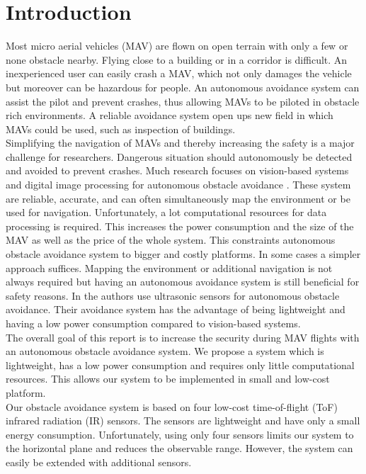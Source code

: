 \chapter{Introduction}
\label{sec:introduction}
Most micro aerial vehicles (MAV) are flown on open terrain with only a few or none obstacle nearby. Flying close to a building or in a corridor is difficult. An inexperienced user can easily crash a MAV, which not only damages the vehicle but moreover can be hazardous for people.  An autonomous avoidance system can assist the pilot and prevent crashes, thus allowing MAVs to be piloted in obstacle rich environments. A reliable avoidance system open ups new field in which MAVs could be used, such as inspection of buildings.\\
Simplifying the navigation of MAVs and thereby increasing the safety is a major challenge for researchers. Dangerous situation should autonomously be detected and avoided to prevent crashes. Much research focuses on vision-based systems and digital image processing for autonomous obstacle avoidance \cite{heng2011autonomous} \cite{frew2004vision} \cite{ahrens2009vision}. These system are reliable, accurate, and can often simultaneously map the environment or be used for navigation. Unfortunately, a lot computational resources for data processing is required. This increases the power consumption and the size of the MAV as well as the price of the whole system. This constraints autonomous obstacle avoidance system to bigger and costly platforms. In some cases a simpler approach suffices. Mapping the environment or additional navigation is not always required but having an autonomous avoidance system is still beneficial for safety reasons. In \cite{gupta2015obstacle} the authors use ultrasonic sensors for autonomous obstacle avoidance. Their avoidance system has the advantage of being lightweight and having a low power consumption compared to vision-based systems.\\
The overall goal of this report is to increase the security during MAV flights with an autonomous obstacle avoidance system. We propose a system which is lightweight, has a low power consumption and requires only little computational resources. This allows our system to be implemented in small and low-cost platform.\\ 
Our obstacle avoidance system is based on four low-cost time-of-flight (ToF) infrared radiation (IR) sensors. The sensors are lightweight and have only a small energy consumption. Unfortunately, using only four sensors limits our system to the horizontal plane and reduces the observable range. However, the system can easily be extended with additional sensors.\\

